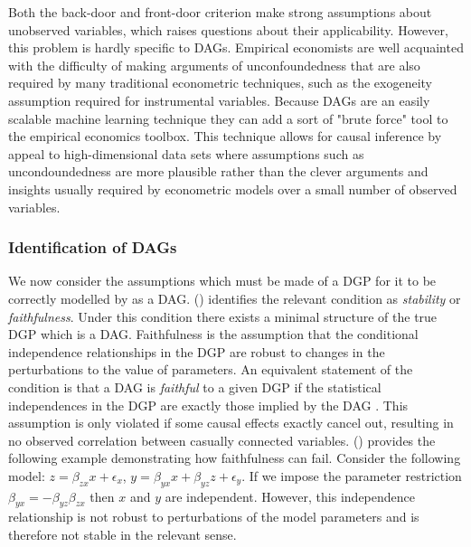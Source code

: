\documentclass{article}
\begin{document}
Both the back-door and front-door criterion make strong assumptions about unobserved variables, which raises questions about their applicability. However, this problem is hardly specific to DAGs. Empirical economists are well acquainted with the difficulty of making arguments of unconfoundedness that are also required by many traditional econometric techniques, such as the exogeneity assumption required for instrumental variables. Because DAGs are an easily scalable machine learning technique they can add a sort of "brute force" tool to the empirical economics toolbox. This technique allows for causal inference by appeal to high-dimensional data sets where assumptions such as uncondoundedness are more plausible rather than the clever arguments and insights usually required by econometric models over a small number of observed variables.

\subsubsection{Identification of DAGs} \label{stability}

We now consider the assumptions which must be made of a DGP for it to be correctly modelled by as a DAG. \citeauthor{pearl2009causality} (\citeyear{pearl2009causality}) identifies the relevant condition as \textit{stability} or \textit{faithfulness}. Under this condition there exists a minimal structure of the true DGP which is a DAG. Faithfulness is the assumption that the conditional independence relationships in the DGP are robust to changes in the perturbations to the value of parameters. An equivalent statement of the condition is that a DAG is \textit{faithful} to a given DGP if the statistical independences in the DGP are exactly those implied by the DAG \parencite{spirtes2000causation}. This assumption is only violated if some causal effects exactly cancel out, resulting in no observed correlation between casually connected variables. \citeauthor{pearl2009causality} (\citeyear{pearl2009causality}) provides the following example demonstrating how faithfulness can fail. Consider the following model: $z = \beta_{zx} x + \epsilon_x$, $ y = \beta_{yx} x + \beta_{yz} z + \epsilon_y$. If we impose the parameter restriction $\beta_{yx} = -\beta_{yz}\beta_{zx}$ then $x$ and $y$ are independent. However, this independence relationship is not robust to perturbations of the model parameters and is therefore not stable in the relevant sense. 
\end{document}
